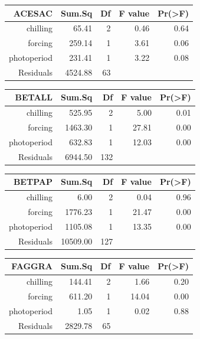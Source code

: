 \documentclass{article}\usepackage[]{graphicx}\usepackage[]{color}
\begin{document}
\begin{table}[ht]
\centering
\begin{tabular}{rrrrr}
  \hline
  ACESAC & Sum.Sq & Df & F value & Pr(>F) \\
 \hline
chilling & 65.41 &   2 & 0.46 & 0.64 \\ 
  forcing & 259.14 &   1 & 3.61 & 0.06 \\ 
  photoperiod & 231.41 &   1 & 3.22 & 0.08 \\ 
  Residuals & 4524.88 &  63 &  &  \\ 
   \hline
\end{tabular}
\end{table}
\begin{table}[ht]
\centering
\begin{tabular}{rrrrr}
  \hline
  BETALL & Sum.Sq & Df & F value & Pr(>F) \\
 \hline
chilling & 525.95 &   2 & 5.00 & 0.01 \\ 
  forcing & 1463.30 &   1 & 27.81 & 0.00 \\ 
  photoperiod & 632.83 &   1 & 12.03 & 0.00 \\ 
  Residuals & 6944.50 & 132 &  &  \\ 
   \hline
\end{tabular}
\end{table}
\begin{table}[ht]
\centering
\begin{tabular}{rrrrr}
  \hline
  BETPAP & Sum.Sq & Df & F value & Pr(>F) \\
 \hline
chilling & 6.00 &   2 & 0.04 & 0.96 \\ 
  forcing & 1776.23 &   1 & 21.47 & 0.00 \\ 
  photoperiod & 1105.08 &   1 & 13.35 & 0.00 \\ 
  Residuals & 10509.00 & 127 &  &  \\ 
   \hline
\end{tabular}
\end{table}
\begin{table}[ht]
\centering
\begin{tabular}{rrrrr}
  \hline
  FAGGRA & Sum.Sq & Df & F value & Pr(>F) \\
 \hline
chilling & 144.41 &   2 & 1.66 & 0.20 \\ 
  forcing & 611.20 &   1 & 14.04 & 0.00 \\ 
  photoperiod & 1.05 &   1 & 0.02 & 0.88 \\ 
  Residuals & 2829.78 &  65 &  &  \\ 
   \hline
\end{tabular}
\end{table}
\end{document}

